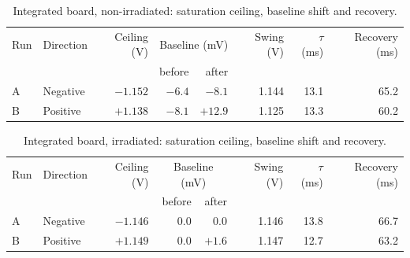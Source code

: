
\begin{table}[h]
\centering
\caption{Integrated board, non-irradiated: saturation ceiling, baseline shift and recovery.}
\label{tab:sat-ceiling-intl}
\small
\begin{tabular}{@{}llrrrrrr@{}}
\toprule
Run & Direction & Ceiling (V) & \multicolumn{2}{c}{Baseline (mV)} & Swing (V) & $\tau$ (ms) & Recovery (ms) \\
    &           &             & before & after & & & \\
\midrule
A & Negative & $-1.152$ & $-6.4$ & $-8.1$ & 1.144 & 13.1 & 65.2 \\
B & Positive & $+1.138$ & $-8.1$ & $+12.9$ & 1.125 & 13.3 & 60.2 \\
\bottomrule
\end{tabular}
\end{table}

\begin{table}[h]
\centering
\caption{Integrated board, irradiated: saturation ceiling, baseline shift and recovery.}
\label{tab:sat-ceiling-iradl}
\small
\begin{tabular}{@{}llrrrrrr@{}}
\toprule
Run & Direction & Ceiling (V) & \multicolumn{2}{c}{Baseline (mV)} & Swing (V) & $\tau$ (ms) & Recovery (ms) \\
    &           &             & before & after & & & \\
\midrule
A & Negative & $-1.146$ & $0.0$ & $0.0$ & 1.146 & 13.8 & 66.7 \\
B & Positive & $+1.149$ & $0.0$ & $+1.6$ & 1.147 & 12.7 & 63.2 \\
\bottomrule
\end{tabular}
\end{table}
